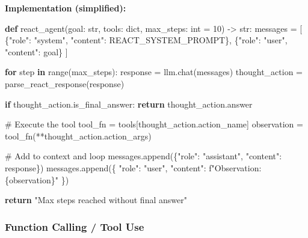 \documentclass[11pt]{article}
\newenvironment{Shaded}{\begin{snugshade}}{\end{snugshade}}
\newcommand{\BuiltInTok}[1]{\textcolor[rgb]{0.50,0.55,0.55}{#1}}
\newcommand{\CommentTok}[1]{\textcolor[rgb]{0.48,0.49,0.49}{#1}}
\newcommand{\ControlFlowTok}[1]{\textcolor[rgb]{0.99,0.74,0.29}{\textbf{#1}}}
\newcommand{\DecValTok}[1]{\textcolor[rgb]{0.96,0.45,0.00}{#1}}
\newcommand{\KeywordTok}[1]{\textcolor[rgb]{0.81,0.81,0.76}{\textbf{#1}}}
\newcommand{\NormalTok}[1]{\textcolor[rgb]{0.81,0.81,0.76}{#1}}
\newcommand{\OperatorTok}[1]{\textcolor[rgb]{0.81,0.81,0.76}{#1}}
\newcommand{\SpecialCharTok}[1]{\textcolor[rgb]{0.24,0.68,0.91}{#1}}
\newcommand{\SpecialStringTok}[1]{\textcolor[rgb]{0.85,0.27,0.33}{#1}}
\newcommand{\StringTok}[1]{\textcolor[rgb]{0.96,0.31,0.31}{#1}}
\begin{document}
\textbf{Implementation (simplified):}


\begin{Shaded}
\begin{Highlighting}[]
\KeywordTok{def}\NormalTok{ react\_agent(goal: }\BuiltInTok{str}\NormalTok{, tools: }\BuiltInTok{dict}\NormalTok{, max\_steps: }\BuiltInTok{int} \OperatorTok{=} \DecValTok{10}\NormalTok{) }\OperatorTok{{-}\textgreater{}} \BuiltInTok{str}\NormalTok{:}
\NormalTok{    messages }\OperatorTok{=}\NormalTok{ [}
\NormalTok{        \{}\StringTok{"role"}\NormalTok{: }\StringTok{"system"}\NormalTok{, }\StringTok{"content"}\NormalTok{: REACT\_SYSTEM\_PROMPT\},}
\NormalTok{        \{}\StringTok{"role"}\NormalTok{: }\StringTok{"user"}\NormalTok{, }\StringTok{"content"}\NormalTok{: goal\}}
\NormalTok{    ]}

    \ControlFlowTok{for}\NormalTok{ step }\KeywordTok{in} \BuiltInTok{range}\NormalTok{(max\_steps):}
\NormalTok{        response }\OperatorTok{=}\NormalTok{ llm.chat(messages)}
\NormalTok{        thought\_action }\OperatorTok{=}\NormalTok{ parse\_react\_response(response)}

        \ControlFlowTok{if}\NormalTok{ thought\_action.is\_final\_answer:}
            \ControlFlowTok{return}\NormalTok{ thought\_action.answer}

        \CommentTok{\# Execute the tool}
\NormalTok{        tool\_fn }\OperatorTok{=}\NormalTok{ tools[thought\_action.action\_name]}
\NormalTok{        observation }\OperatorTok{=}\NormalTok{ tool\_fn(}\OperatorTok{**}\NormalTok{thought\_action.action\_args)}

        \CommentTok{\# Add to context and loop}
\NormalTok{        messages.append(\{}\StringTok{"role"}\NormalTok{: }\StringTok{"assistant"}\NormalTok{, }\StringTok{"content"}\NormalTok{: response\})}
\NormalTok{        messages.append(\{}
            \StringTok{"role"}\NormalTok{: }\StringTok{"user"}\NormalTok{,}
            \StringTok{"content"}\NormalTok{: }\SpecialStringTok{f"Observation: }\SpecialCharTok{\{}\NormalTok{observation}\SpecialCharTok{\}}\SpecialStringTok{"}
\NormalTok{        \})}

    \ControlFlowTok{return} \StringTok{"Max steps reached without final answer"}
\end{Highlighting}
\end{Shaded}

\subsubsection{Function Calling / Tool Use}\label{function-calling--tool-use}
\end{document}
